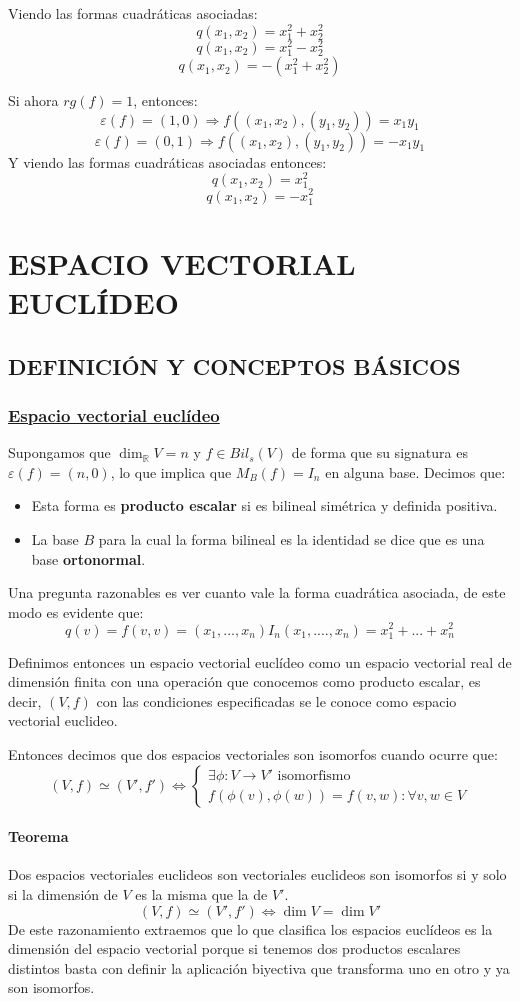 \documentclass[10pt,a4paper,openright]{book}
\begin{document}
Viendo las formas cuadráticas asociadas:
$$q(x_1,x_2) = x_1^2+x_2^2$$
$$q(x_1,x_2) = x_1^2-x_2^2$$
$$q(x_1,x_2) = -(x_1^2+x_2^2)$$

Si ahora $rg(f)=1$, entonces:
$$\varepsilon(f)=(1,0)\Rightarrow f((x_1,x_2),(y_1,y_2)) = x_1y_1$$
$$\varepsilon(f)=(0,1)\Rightarrow f((x_1,x_2),(y_1,y_2)) = -x_1y_1$$
Y viendo las formas cuadráticas asociadas entonces:
$$q(x_1,x_2) = x_1^2$$
$$q(x_1,x_2) = -x_1^2$$

\chapter*{ESPACIO VECTORIAL EUCLÍDEO}
\section*{DEFINICIÓN Y CONCEPTOS BÁSICOS}
\subsection*{\underline{Espacio vectorial euclídeo}}
Supongamos que $\dim_{\mathbb R} V = n$ y $f\in Bil_s(V)$ de forma que su signatura es $\varepsilon(f)=(n,0)$, lo que implica que $M_B(f)=I_n$ en alguna base. Decimos que:
\begin{itemize}
\item Esta forma es \textbf{producto escalar} si es bilineal simétrica y definida positiva.
\item La base $B$ para la cual la forma bilineal es la identidad se dice que es una base \textbf{ortonormal}.
\end{itemize}
Una pregunta razonables es ver cuanto vale la forma cuadrática asociada, de este modo es evidente que:
$$q(v)=f(v,v) = (x_1, ..., x_n)I_n(x_1,...., x_n) = x_1^2+...+x_n^2$$

Definimos entonces un espacio vectorial euclídeo como un espacio vectorial real de dimensión finita con una operación que conocemos como producto escalar, es decir, $(V,f)$ con las condiciones especificadas se le conoce como espacio vectorial euclideo.

Entonces decimos que dos espacios vectoriales son isomorfos cuando ocurre que:
$$(V,f) \simeq (V',f')\Leftrightarrow \begin{cases} \exists \phi: V\rightarrow V' \mbox{ isomorfismo} \\ f(\phi(v),\phi(w)) = f(v,w): \forall v,w\in V\end{cases}$$

\subsubsection*{Teorema}
Dos espacios vectoriales euclideos son vectoriales euclideos son isomorfos si y solo si la dimensión de $V$ es la misma que la de $V'$.
$$(V,f) \simeq (V',f')\Leftrightarrow \dim V = \dim V'$$
De este razonamiento extraemos que lo que clasifica los espacios euclídeos es la dimensión del espacio vectorial porque si tenemos dos productos escalares distintos basta con definir la aplicación biyectiva que transforma uno en otro y ya son isomorfos.
\end{document}
